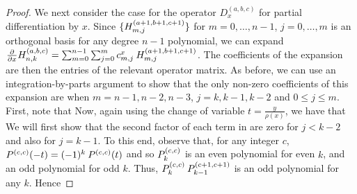 \begin{proof}
We next consider the case for the operator $D_x^{(a,b,c)}$ for partial differentiation by $x$. Since $\{H^{(a+1, b+1, c+1)}_{m,j}\}$ for $m = 0,\dots,n-1$, $j = 0,\dots,m$ is an orthogonal basis for any degree $n-1$ polynomial, we can expand ${\partial \over \partial x} H_{n,k}^{(a,b,c)} = \sum_{m=0}^{n-1} \sum_{j=0}^m c_{m,j}^x \: H^{(a+1, b+1, c+1)}_{m,j}$. The coefficients of the expansion are then the entries of the relevant operator matrix. As before, we can use an integration-by-parts argument to show that the only non-zero coefficients of this expansion are when $m = n-1, n-2, n-3$, $j = k, k-1, k-2$ and $0 \le j \le m$. First, note that
Now, again using the change of variable $t= \frac{y}{\rho(x)}$, we have that
We will first show that the second factor of each term in  are zero for $j < k - 2$ and also for $j = k - 1$. To this end, observe that, for any integer $c$, ${P}^{(c,c)}(-t) = (-1)^k \: {P}^{(c,c)}(t)$ and so ${P}_k^{(c,c)}$ is an even polynomial for even $k$, and an odd polynomial for odd $k$. Thus, ${P}_k^{(c,c)} \: {P}_{k-1}^{(c+1,c+1)}$ is an odd polynomial for any $k$. Hence

\end{proof}
